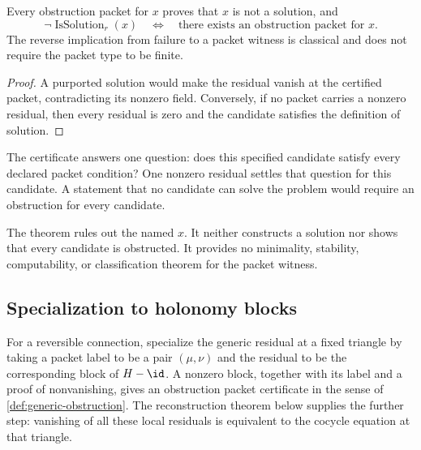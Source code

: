 \begin{theorem}
\label{thm:generic-obstruction}
Every obstruction packet for $x$ proves that $x$ is not a solution, and
\[
\neg\operatorname{IsSolution}_r(x)
\quad\Longleftrightarrow\quad
\text{there exists an obstruction packet for }x.
\]
The reverse implication from failure to a packet witness is classical and
does not require the packet type to be finite.
\end{theorem}

\begin{proof}
A purported solution would make the residual vanish at the certified packet,
contradicting its nonzero field.  Conversely, if no packet carries a nonzero
residual, then every residual is zero and the candidate satisfies the
definition of solution.
\end{proof}

\begin{interpretation}[title={What one obstruction certifies}]
The certificate answers one question: does this specified candidate satisfy
every declared packet condition?  One nonzero residual settles that question
for this candidate.  A statement that no candidate can solve the problem
would require an obstruction for every candidate.
\end{interpretation}

\begin{boundary}
The theorem rules out the named $x$.  It neither constructs a solution nor
shows that every candidate is obstructed.  It provides no minimality,
stability, computability, or classification theorem for the packet witness.
\end{boundary}

\subsection{Specialization to holonomy blocks}

For a reversible connection, specialize the generic residual at a fixed
triangle by taking a packet label to be a pair $(\mu,\nu)$ and the residual
to be the corresponding block of $H-\id$.  A nonzero block, together with its
label and a proof of nonvanishing, gives an obstruction packet certificate
in the sense of \cref{def:generic-obstruction}.  The reconstruction theorem
below supplies the further step: vanishing of all these local residuals is
equivalent to the cocycle equation at that triangle.

